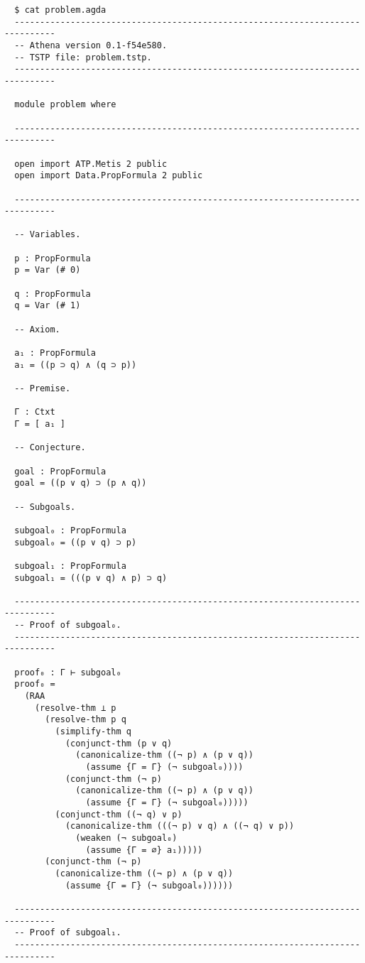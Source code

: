 \documentclass[../main.tex]{subfiles}
\begin{document}
\begin{subappendices}
\begin{verbatim}
  $ cat problem.agda
  ------------------------------------------------------------------------------
  -- Athena version 0.1-f54e580.
  -- TSTP file: problem.tstp.
  ------------------------------------------------------------------------------

  module problem where

  ------------------------------------------------------------------------------

  open import ATP.Metis 2 public
  open import Data.PropFormula 2 public

  ------------------------------------------------------------------------------

  -- Variables.

  p : PropFormula
  p = Var (# 0)

  q : PropFormula
  q = Var (# 1)

  -- Axiom.

  a₁ : PropFormula
  a₁ = ((p ⊃ q) ∧ (q ⊃ p))

  -- Premise.

  Γ : Ctxt
  Γ = [ a₁ ]

  -- Conjecture.

  goal : PropFormula
  goal = ((p ∨ q) ⊃ (p ∧ q))

  -- Subgoals.

  subgoal₀ : PropFormula
  subgoal₀ = ((p ∨ q) ⊃ p)

  subgoal₁ : PropFormula
  subgoal₁ = (((p ∨ q) ∧ p) ⊃ q)

  ------------------------------------------------------------------------------
  -- Proof of subgoal₀.
  ------------------------------------------------------------------------------

  proof₀ : Γ ⊢ subgoal₀
  proof₀ =
    (RAA
      (resolve-thm ⊥ p
        (resolve-thm p q
          (simplify-thm q
            (conjunct-thm (p ∨ q)
              (canonicalize-thm ((¬ p) ∧ (p ∨ q))
                (assume {Γ = Γ} (¬ subgoal₀))))
            (conjunct-thm (¬ p)
              (canonicalize-thm ((¬ p) ∧ (p ∨ q))
                (assume {Γ = Γ} (¬ subgoal₀)))))
          (conjunct-thm ((¬ q) ∨ p)
            (canonicalize-thm (((¬ p) ∨ q) ∧ ((¬ q) ∨ p))
              (weaken (¬ subgoal₀)
                (assume {Γ = ∅} a₁)))))
        (conjunct-thm (¬ p)
          (canonicalize-thm ((¬ p) ∧ (p ∨ q))
            (assume {Γ = Γ} (¬ subgoal₀))))))

  ------------------------------------------------------------------------------
  -- Proof of subgoal₁.
  ------------------------------------------------------------------------------


\end{verbatim}
\end{subappendices}
\end{document}
